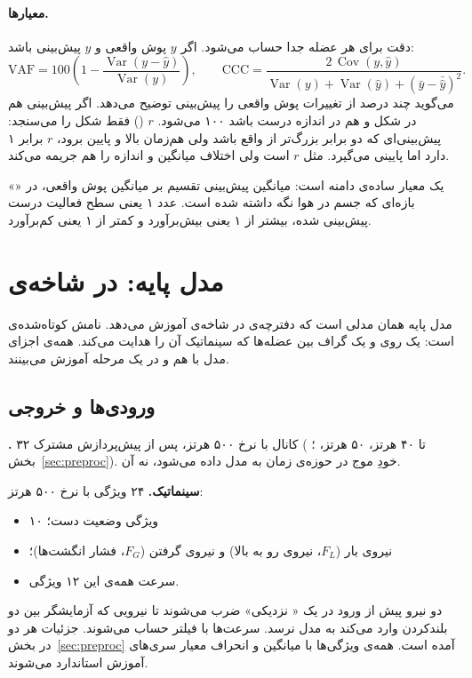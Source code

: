 \paragraph{معیارها.} دقت برای هر عضله جدا حساب می‌شود. اگر $y$ پوش واقعی و $\hat y$ پیش‌بینی باشد:
\begin{equation}
\mathrm{VAF}=100\left(1-\frac{\operatorname{Var}(y-\hat y)}{\operatorname{Var}(y)}\right),\qquad
\mathrm{CCC}=\frac{2\,\operatorname{Cov}(y,\hat y)}{\operatorname{Var}(y)+\operatorname{Var}(\hat y)+(\bar y-\bar{\hat y})^2}.
\end{equation}
 می‌گوید چند درصد از تغییرات پوش واقعی را پیش‌بینی توضیح می‌دهد. اگر پیش‌بینی هم در شکل و هم در اندازه درست باشد ۱۰۰ می‌شود. $r$ () فقط شکل را می‌سنجد: پیش‌بینی‌ای که دو برابر بزرگ‌تر از واقع باشد ولی هم‌زمان بالا و پایین برود، $r$ برابر ۱ دارد اما  پایینی می‌گیرد.  مثل $r$ است ولی اختلاف میانگین و اندازه را هم جریمه می‌کند.

«» یک معیار ساده‌ی دامنه است: میانگین پیش‌بینی تقسیم بر میانگین پوش واقعی، در بازه‌ای که جسم در هوا نگه داشته شده است. عدد ۱ یعنی سطح فعالیت درست پیش‌بینی شده، بیشتر از ۱ یعنی بیش‌برآورد و کمتر از ۱ یعنی کم‌برآورد.



\FloatBarrier
\section{مدل پایه:  در شاخه‌ی }
\label{sec:base}

مدل پایه همان مدلی است که دفترچه‌ی  در شاخه‌ی  آموزش می‌دهد. نامش کوتاه‌شده‌ی  است: یک  روی  و یک گراف بین عضله‌ها که سینماتیک آن را هدایت می‌کند. همه‌ی اجزای مدل با هم و در یک مرحله آموزش می‌بینند.

\subsection{ورودی‌ها و خروجی}

\textbf{.} ۳۲ کانال با نرخ ۵۰۰ هرتز، پس از پیش‌پردازش مشترک (  تا ۴۰ هرتز،  ۵۰ هرتز، ؛ بخش~\ref{sec:preproc}). خودِ موج در حوزه‌ی زمان به مدل داده می‌شود، نه  آن.

\textbf{سینماتیک.} ۲۴ ویژگی با نرخ ۵۰۰ هرتز:
\begin{itemize}
\item ۱۰ ویژگی وضعیت دست؛
\item نیروی بار ($F_L$، نیروی رو به بالا) و نیروی گرفتن ($F_G$، فشار انگشت‌ها)؛
\item سرعت همه‌ی این ۱۲ ویژگی.
\end{itemize}
دو نیرو پیش از ورود در یک « نزدیکی» ضرب می‌شوند تا نیرویی که آزمایشگر بین دو بلندکردن وارد می‌کند به مدل نرسد. سرعت‌ها با فیلتر  حساب می‌شوند. جزئیات هر دو در بخش~\ref{sec:preproc} آمده است. همه‌ی ویژگی‌ها با میانگین و انحراف معیار سری‌های آموزش استاندارد می‌شوند.


